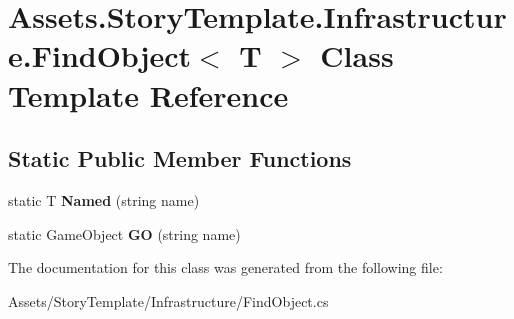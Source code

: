 \hypertarget{classAssets_1_1StoryTemplate_1_1Infrastructure_1_1FindObject}{}\section{Assets.\+Story\+Template.\+Infrastructure.\+Find\+Object$<$ T $>$ Class Template Reference}
\label{classAssets_1_1StoryTemplate_1_1Infrastructure_1_1FindObject}
\subsection*{Static Public Member Functions}
\begin{DoxyCompactItemize}
\item 
static T {\bfseries Named} (string name)\hypertarget{classAssets_1_1StoryTemplate_1_1Infrastructure_1_1FindObject_a01b258f19960a78c424477227516c3fe}{}\label{classAssets_1_1StoryTemplate_1_1Infrastructure_1_1FindObject_a01b258f19960a78c424477227516c3fe}

\item 
static Game\+Object {\bfseries GO} (string name)\hypertarget{classAssets_1_1StoryTemplate_1_1Infrastructure_1_1FindObject_a7f2e3b4951b8333ace4e7ac5da679ed5}{}\label{classAssets_1_1StoryTemplate_1_1Infrastructure_1_1FindObject_a7f2e3b4951b8333ace4e7ac5da679ed5}

\end{DoxyCompactItemize}


The documentation for this class was generated from the following file\+:\begin{DoxyCompactItemize}
\item 
Assets/\+Story\+Template/\+Infrastructure/Find\+Object.\+cs\end{DoxyCompactItemize}

